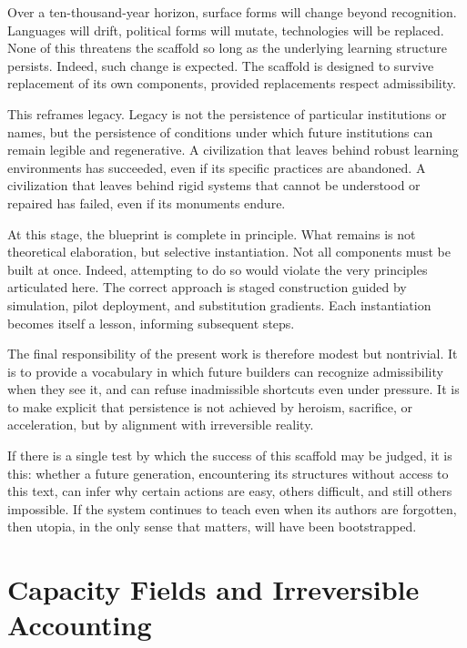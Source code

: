 \documentclass[12pt,oneside]{book}
\begin{document}
Over a ten-thousand-year horizon, surface forms will change beyond recognition. Languages will drift, political forms will mutate, technologies will be replaced. None of this threatens the scaffold so long as the underlying learning structure persists. Indeed, such change is expected. The scaffold is designed to survive replacement of its own components, provided replacements respect admissibility.

This reframes legacy. Legacy is not the persistence of particular institutions or names, but the persistence of conditions under which future institutions can remain legible and regenerative. A civilization that leaves behind robust learning environments has succeeded, even if its specific practices are abandoned. A civilization that leaves behind rigid systems that cannot be understood or repaired has failed, even if its monuments endure.

At this stage, the blueprint is complete in principle. What remains is not theoretical elaboration, but selective instantiation. Not all components must be built at once. Indeed, attempting to do so would violate the very principles articulated here. The correct approach is staged construction guided by simulation, pilot deployment, and substitution gradients. Each instantiation becomes itself a lesson, informing subsequent steps.

The final responsibility of the present work is therefore modest but nontrivial. It is to provide a vocabulary in which future builders can recognize admissibility when they see it, and can refuse inadmissible shortcuts even under pressure. It is to make explicit that persistence is not achieved by heroism, sacrifice, or acceleration, but by alignment with irreversible reality.

If there is a single test by which the success of this scaffold may be judged, it is this: whether a future generation, encountering its structures without access to this text, can infer why certain actions are easy, others difficult, and still others impossible. If the system continues to teach even when its authors are forgotten, then utopia, in the only sense that matters, will have been bootstrapped.

\newpage
\appendix
\renewcommand{\chaptername}{Appendix}

\chapter{Capacity Fields and Irreversible Accounting}
\end{document}
